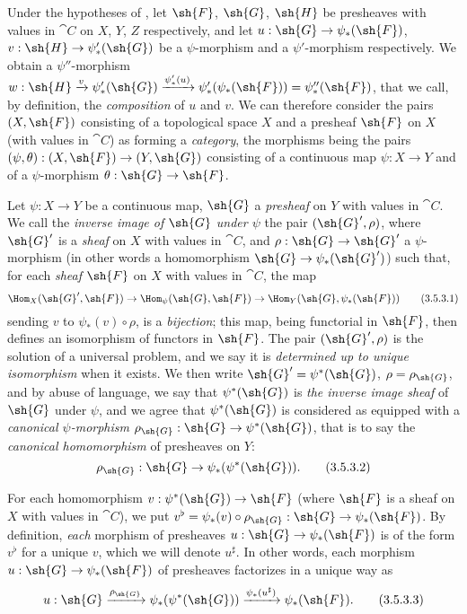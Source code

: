 \begin{env}[3.5.2]
\label{0.3.5.2}
Under the hypotheses of , let $\sh{F}$, $\sh{G}$, $\sh{H}$ be
presheaves with values in $\cat{C}$ on $X$, $Y$, $Z$ respectively, and let
$u:\sh{G}\to\psi_*(\sh{F})$, $v:\sh{H}\to\psi_*'(\sh{G})$ be a $\psi$-morphism
and a $\psi'$-morphism respectively. We obtain a $\psi''$-morphism
$w:\sh{H}\xrightarrow{v}\psi_*'(\sh{G})\xrightarrow{\psi_*'(u)}
  \psi_*'(\psi_*(\sh{F}))=\psi_*''(\sh{F})$, that we call, by definition, the
\emph{composition} of $u$ and $v$. We can therefore consider the pairs
$(X,\sh{F})$ consisting of a topological space $X$ and a presheaf $\sh{F}$ on
$X$ (with values in $\cat{C}$) as forming a \emph{category}, the morphisms being the
pairs $(\psi,\theta):(X,\sh{F})\to(Y,\sh{G})$ consisting of a continuous map
$\psi:X\to Y$ and of a $\psi$-morphism $\theta:\sh{G}\to\sh{F}$.
\end{env}

\begin{env}[3.5.3]
\label{0.3.5.3}
Let $\psi:X\to Y$ be a continuous map, $\sh{G}$ a \emph{presheaf} on $Y$ with
values in $\cat{C}$. We call the \emph{inverse image of $\sh{G}$ under $\psi$} the
pair $(\sh{G}',\rho)$, where $\sh{G}'$ is a \emph{sheaf} on $X$ with values in
$\cat{C}$, and $\rho:\sh{G}\to\sh{G}'$ a $\psi$-morphism (in other words a
homomorphism $\sh{G}\to\psi_*(\sh{G}')$) such that, for each \emph{sheaf}
$\sh{F}$ on $X$ with values in $\cat{C}$, the map
\[
  \Hom_X(\sh{G}',\sh{F})\to\Hom_\psi(\sh{G},\sh{F})
  \to\Hom_Y(\sh{G},\psi_*(\sh{F}))
  \tag{3.5.3.1}
\]
sending $v$ to $\psi_*(v)\circ\rho$, is a \emph{bijection}; this map, being
functorial in $\sh{F}$, then defines an isomorphism of functors in $\sh{F}$. The
pair $(\sh{G}',\rho)$ is the solution of a universal problem, and we say it is
\emph{determined up to unique isomorphism} when it exists. We then write
$\sh{G}'=\psi^*(\sh{G})$, $\rho=\rho_\sh{G}$, and by abuse of language, we say
that $\psi^*(\sh{G})$ is \emph{the inverse image sheaf} of $\sh{G}$ under
$\psi$, and we agree that $\psi^*(\sh{G})$ is considered as equipped with a
\emph{canonical $\psi$-morphism $\rho_\sh{G}:\sh{G}\to\psi^*(\sh{G})$}, that is
to say the \emph{canonical homomorphism} of presheaves on $Y$:
\[
  \rho_\sh{G}:\sh{G}\to\psi_*(\psi^*(\sh{G})).
  \tag{3.5.3.2}
\]

For each homomorphism $v:\psi^*(\sh{G})\to\sh{F}$ (where $\sh{F}$ is a sheaf on
$X$ with values in $\cat{C}$), we put
$v^\flat=\psi_*(v)\circ\rho_\sh{G}:\sh{G}\to\psi_*(\sh{F})$. By definition,
\emph{each} morphism of presheaves $u:\sh{G}\to\psi_*(\sh{F})$ is of the form
$v^\flat$ for a unique $v$, which we will denote $u^\sharp$. In other words,
each morphism $u:\sh{G}\to\psi_*(\sh{F})$ of presheaves factorizes in a unique
way as
\[
\label{0.3.5.3.3}
  u:\sh{G}\xrightarrow{\rho_\sh{G}}\psi_*(\psi^*(\sh{G}))
  \xrightarrow{\psi_*(u^\sharp)}\psi_*(\sh{F}).
  \tag{3.5.3.3}
\]
\end{env}

